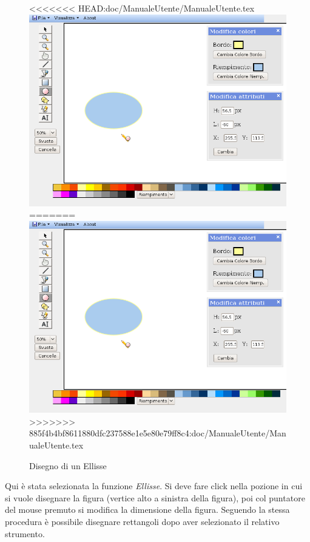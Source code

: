 \begin{figure}[!ht]
\centering
<<<<<<< HEAD:doc/ManualeUtente/ManualeUtente.tex
\includegraphics[scale=0.4]{images/ellisse.png}
=======
\includegraphics[scale=1]{images/ellisse.png}
>>>>>>> 885f4b4bf8611880dfc237588e1e5e80e79ff8c4:doc/ManualeUtente/ManualeUtente.tex
\caption{Disegno di un Ellisse}
\end{figure} 

\vspace{100pt}
Qui \`e stata selezionata la funzione \textit{Ellisse}. Si deve fare click nella pozione in cui si vuole disegnare la figura (vertice alto a sinistra della figura), poi col puntatore del mouse premuto si modifica la dimensione della figura. Seguendo la stessa procedura \`e possibile disegnare rettangoli dopo aver selezionato il relativo strumento.

